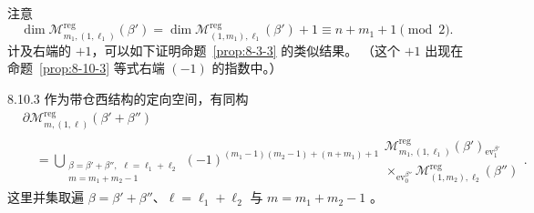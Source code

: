 注意
\[
 \dim\mathcal M_{m_1,(1,\ell_1)}^{\mathrm{reg}}(\beta')
 =\dim\mathcal M_{(1,m_1),\ell_1}^{\mathrm{reg}}(\beta')+1
 \equiv n+m_1+1\pmod2.
\]
计及右端的 $+1$，可以如下证明命题~\ref{prop:8-3-3} 的类似结果。
（这个 $+1$ 出现在命题~\ref{prop:8-10-3} 等式右端 $(-1)$ 的指数中。）

\begin{proposition}{8.10.3}\label{prop:8-10-3}
作为带仓西结构的定向空间，有同构
\begingroup
\small
\[
\begin{aligned}
&\partial\mathcal M_{m,(1,\ell)}^{\mathrm{reg}}(\beta'+\beta'')\\
&\quad={}
\bigcup_{\substack{\beta=\beta'+\beta'',\ \,\ell=\ell_1+\ell_2\\
m=m_1+m_2-1}}
(-1)^{(m_1-1)(m_2-1)+(n+m_1)+1}
\begin{gathered}
\mathcal M_{m_1,(1,\ell_1)}^{\mathrm{reg}}(\beta')
{}_{\operatorname{ev}_1^{\beta'}}\\[-2pt]
{}\mathop{\times}_{\operatorname{ev}_0^{\beta''}}
\mathcal M_{(1,m_2),\ell_2}^{\mathrm{reg}}(\beta'')
\end{gathered}.
\end{aligned}
\]
\endgroup
这里并集取遍
$\beta=\beta'+\beta''$、$\ell=\ell_1+\ell_2$ 与
$m=m_1+m_2-1$
。
\end{proposition}

